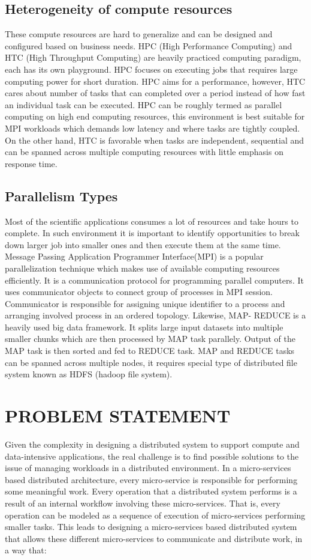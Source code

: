 \documentclass[sigconf]{acmart}
\begin{document}
\subsection{Heterogeneity of compute resources}
These compute resources are hard to generalize and can be designed and configured based on business needs. HPC (High Performance Computing) and HTC (High Throughput Computing) are heavily practiced computing paradigm, each has its own playground. HPC focuses on executing jobs that requires large computing power for short duration. HPC aims for a performance, however, HTC cares about number of tasks that can completed over a period instead of how fast an individual task can be executed. HPC can be roughly termed as parallel computing on high end computing resources, this environment is best suitable for MPI workloads which demands low latency and where tasks are tightly coupled. On the other hand, HTC is favorable when tasks are independent, sequential and can be spanned across multiple computing resources with little emphasis on response time. 

\subsection{Parallelism Types}
Most of the scientific applications consumes a lot of resources and take hours to complete. In such environment it is important to identify opportunities to break down larger job into smaller ones and then execute them at the same time. Message Passing Application Programmer Interface(MPI) is a popular parallelization technique which makes use of available computing resources efficiently. It is a communication protocol for programming parallel computers. It uses communicator objects to connect group of processes in MPI session. Communicator is responsible for assigning unique identifier to a process and arranging involved process in an ordered topology. Likewise, MAP- REDUCE is a heavily used big data framework. It splits large input datasets into multiple smaller chunks which are then processed by MAP task parallely. Output of the MAP task is then sorted and fed to REDUCE task. MAP and REDUCE tasks can be spanned across multiple nodes, it requires special type of distributed file system known as HDFS (hadoop file system).  

\section{PROBLEM STATEMENT}
Given the complexity in designing a distributed system to support compute and data-intensive applications, the real challenge is to find possible solutions to the issue of managing workloads in a distributed environment. In a micro-services based distributed architecture, every micro-service is responsible for performing some meaningful work. Every operation that a distributed system performs is a result of an internal workflow involving these micro-services. That is, every operation can be modeled as a sequence of execution of micro-services performing smaller tasks. This leads to designing a micro-services based distributed system that allows these different micro-services to communicate and distribute work, in a way that:
\end{document}
